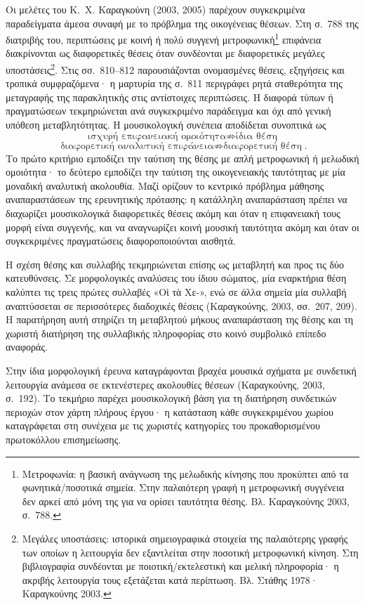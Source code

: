 \documentclass[11pt,a4paper]{article}
\begin{document}
Οι μελέτες του Κ.~Χ. Καραγκούνη (2003, 2005) παρέχουν συγκεκριμένα παραδείγματα άμεσα συναφή με το πρόβλημα της οικογένειας θέσεων. Στη σ.~788 της διατριβής του, περιπτώσεις με κοινή ή πολύ συγγενή μετροφωνική\footnote{Μετροφωνία: η βασική ανάγνωση της μελωδικής κίνησης που προκύπτει από τα φωνητικά/ποσοτικά σημεία. Στην παλαιότερη γραφή η μετροφωνική συγγένεια δεν αρκεί από μόνη της για να ορίσει ταυτότητα θέσης. Βλ. Καραγκούνης 2003, σ.~788.} επιφάνεια διακρίνονται ως διαφορετικές θέσεις όταν συνδέονται με διαφορετικές μεγάλες υποστάσεις\footnote{Μεγάλες υποστάσεις: ιστορικά σημειογραφικά στοιχεία της παλαιότερης γραφής των οποίων η λειτουργία δεν εξαντλείται στην ποσοτική μετροφωνική κίνηση. Στη βιβλιογραφία συνδέονται με ποιοτική/εκτελεστική και μελική πληροφορία· η ακριβής λειτουργία τους εξετάζεται κατά περίπτωση. Βλ. Στάθης 1978· Καραγκούνης 2003.}. Στις σσ.~810--812 παρουσιάζονται ονομασμένες θέσεις, εξηγήσεις και τροπικά συμφραζόμενα· η μαρτυρία της σ.~811 περιγράφει ρητά σταθερότητα της μεταγραφής της παρακλητικής στις αντίστοιχες περιπτώσεις. Η διαφορά τύπων ή πραγματώσεων τεκμηριώνεται ανά συγκεκριμένο παράδειγμα και όχι από γενική υπόθεση μεταβλητότητας. Η μουσικολογική συνέπεια αποδίδεται συνοπτικά ως
\[
\boxed{\text{ισχυρή επιφανειακή ομοιότητα}\not\Rightarrow\text{ίδια θέση}}
\]
\[
\boxed{\text{διαφορετική αναλυτική επιφάνεια}\not\Rightarrow\text{διαφορετική θέση}}.
\]
Το πρώτο κριτήριο εμποδίζει την ταύτιση της θέσης με απλή μετροφωνική ή μελωδική ομοιότητα· το δεύτερο εμποδίζει την ταύτιση της οικογενειακής ταυτότητας με μία μοναδική αναλυτική ακολουθία. Μαζί ορίζουν το κεντρικό πρόβλημα μάθησης αναπαραστάσεων της ερευνητικής πρότασης: η κατάλληλη αναπαράσταση πρέπει να διαχωρίζει μουσικολογικά διαφορετικές θέσεις ακόμη και όταν η επιφανειακή τους μορφή είναι συγγενής, και να αναγνωρίζει κοινή μουσική ταυτότητα ακόμη και όταν οι συγκεκριμένες πραγματώσεις διαφοροποιούνται αισθητά.

Η σχέση θέσης και συλλαβής τεκμηριώνεται επίσης ως μεταβλητή και προς τις δύο κατευθύνσεις. Σε μορφολογικές αναλύσεις του ίδιου σώματος, μία εναρκτήρια θέση καλύπτει τις τρεις πρώτες συλλαβές «Οἱ τὰ Χε-», ενώ σε άλλα σημεία μία συλλαβή αναπτύσσεται σε περισσότερες διαδοχικές θέσεις (Καραγκούνης, 2003, σσ.~207, 209). Η παρατήρηση αυτή στηρίζει τη μεταβλητού μήκους αναπαράσταση της θέσης και τη χωριστή διατήρηση της συλλαβικής πληροφορίας στο κοινό συμβολικό επίπεδο αναφοράς.

Στην ίδια μορφολογική έρευνα καταγράφονται βραχέα μουσικά σχήματα με συνδετική λειτουργία ανάμεσα σε εκτενέστερες ακολουθίες θέσεων (Καραγκούνης, 2003, σ.~192). Το τεκμήριο παρέχει μουσικολογική βάση για τη διατήρηση συνδετικών περιοχών στον χάρτη πλήρους έργου· η κατάσταση κάθε συγκεκριμένου χωρίου καταγράφεται στη συνέχεια με τις χωριστές κατηγορίες του προκαθορισμένου πρωτοκόλλου επισημείωσης.
\end{document}
